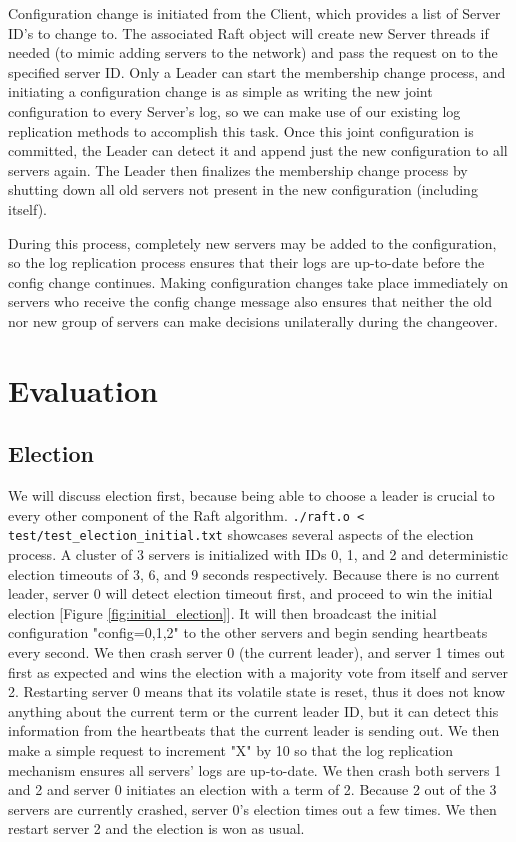 \documentclass[letterpaper,twocolumn,10pt]{article}
\begin{document}
Configuration change is initiated from the Client, which provides a list of Server ID's to change to. The associated Raft object will create new Server threads if needed (to mimic adding servers to the network) and pass the request on to the specified server ID. Only a Leader can start the membership change process, and initiating a configuration change is as simple as writing the new joint configuration to every Server's log, so we can make use of our existing log replication methods to accomplish this task. Once this joint configuration is committed, the Leader can detect it and append just the new configuration to all servers again. The Leader then finalizes the membership change process by shutting down all old servers not present in the new configuration (including itself).

During this process, completely new servers may be added to the configuration, so the log replication process ensures that their logs are up-to-date before the config change continues. Making configuration changes take place immediately on servers who receive the config change message also ensures that neither the old nor new group of servers can make decisions unilaterally during the changeover. 

\section{Evaluation}
\subsection{Election}
We will discuss election first, because being able to choose a leader is crucial to every other component of the Raft algorithm. \texttt{./raft.o < test/test\_election\_initial.txt} showcases several aspects of the election process. A cluster of 3 servers is initialized with IDs 0, 1, and 2 and deterministic election timeouts of 3, 6, and 9 seconds respectively. Because there is no current leader, server 0 will detect election timeout first, and proceed to win the initial election [Figure \ref{fig:initial_election}]. It will then broadcast the initial configuration "config=0,1,2" to the other servers and begin sending heartbeats every second. We then crash server 0 (the current leader), and server 1 times out first as expected and wins the election with a majority vote from itself and server 2. Restarting server 0 means that its volatile state is reset, thus it does not know anything about the current term or the current leader ID, but it can detect this information from the heartbeats that the current leader is sending out. We then make a simple request to increment "X" by 10 so that the log replication mechanism ensures all servers' logs are up-to-date. We then crash both servers 1 and 2 and server 0 initiates an election with a term of 2. Because 2 out of the 3 servers are currently crashed, server 0's election times out a few times. We then restart server 2 and the election is won as usual.
\end{document}
